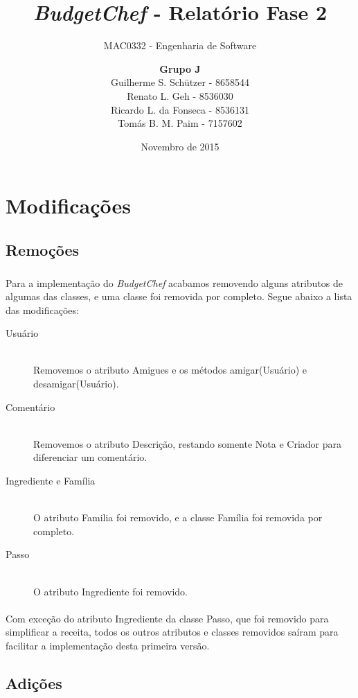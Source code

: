 \documentclass{article}
\title{\emph{BudgetChef} - Relatório Fase 2}
\subtitle{MAC0332 - Engenharia de Software}
\author{\textbf{Grupo J}  \\
        Guilherme S. Schützer - 8658544\\
        Renato L. Geh - 8536030\\
        Ricardo L. da Fonseca - 8536131\\
        Tomás B. M. Paim - 7157602}
\date{Novembro de 2015}
\begin{document}
\maketitle

\section{Modificações}

\subsection{Remoções}
\paragraph{}Para a implementação do \emph{BudgetChef}\textsuperscript{\textregistered} acabamos removendo alguns atributos de algumas das classes, e uma classe foi removida por completo. Segue abaixo a lista das modificações:

\begin{description}
\item[Usuário]
\hfill \\ Removemos o atributo Amigues e os métodos amigar(Usuário) e desamigar(Usuário).


\item[Comentário]
\hfill \\ Removemos o atributo Descrição, restando somente Nota e Criador para diferenciar um comentário.

\item[Ingrediente e Família]
\hfill \\ O atributo Familia foi removido, e a classe Família foi removida por completo.

\item[Passo]
\hfill \\ O atributo Ingrediente foi removido.

\end{description}

\paragraph{}Com exceção do atributo Ingrediente da classe Passo, que foi removido para simplificar a receita, todos os outros atributos e classes removidos saíram para facilitar a implementação desta primeira versão.

\subsection{Adições}
\end{document}
